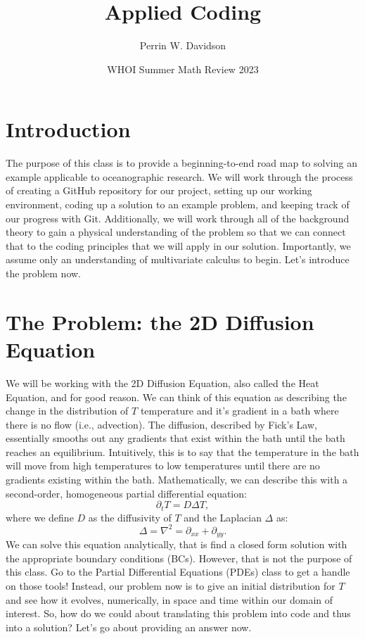 \documentclass[11pt]{article}
\begin{document}
\title{Applied Coding}

\author{Perrin W. Davidson}

\date{WHOI Summer Math Review 2023}

\maketitle

\section*{Introduction}

The purpose of this class is to provide a beginning-to-end road map to solving an example applicable to oceanographic research.
We will work through the process of creating a GitHub repository for our project, setting up our working environment, coding up a solution to an example problem, and keeping track of our progress with Git. 
Additionally, we will work through all of the background theory to gain a physical understanding of the problem so that we can connect that to the coding principles that we will apply in our solution.
Importantly, we assume only an understanding of multivariate calculus to begin.
Let's introduce the problem now.

\section*{The Problem: the 2D Diffusion Equation}

We will be working with the 2D Diffusion Equation, also called the Heat Equation, and for good reason.
We can think of this equation as describing the change in the distribution of $T$ temperature and it's gradient in a bath where there is no flow (i.e., advection).
The diffusion, described by Fick's Law, essentially smooths out any gradients that exist within the bath until the bath reaches an equilibrium.
Intuitively, this is to say that the temperature in the bath will move from high temperatures to low temperatures until there are no gradients existing within the bath.
Mathematically, we can describe this with a second-order, homogeneous partial differential equation:
\begin{equation}
	\partial_t T = D\Delta T,
	\label{eq:diffusion}
\end{equation}
where we define $D$ as the diffusivity of  $T$ and the Laplacian $\Delta$ as:
\begin{equation}
	\Delta = \nabla^2 = \partial_{x x} + \partial_{yy}.
\end{equation}
We can solve this equation analytically, that is find a closed form solution with the appropriate boundary conditions (BCs).
However, that is not the purpose of this class.
Go to the Partial Differential Equations (PDEs) class to get a handle on those tools!
Instead, our problem now is to give an initial distribution for $T$ and see how it evolves, numerically, in space and time within our domain of interest.
So, how do we could about translating this problem into code and thus into a solution? 
Let's go about providing an answer now. 
\end{document}
